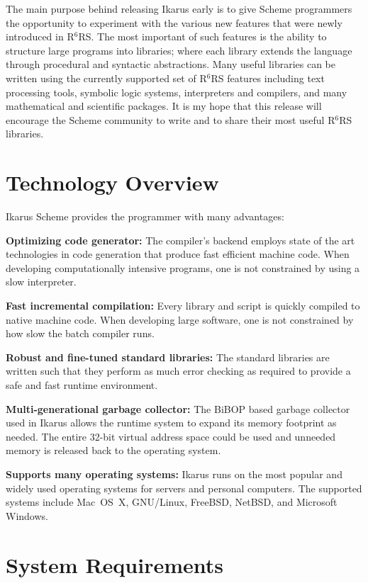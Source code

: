 \documentclass[onecolumn, 12pt, twoside, openright, dvipdfm]{book}
\newcommand{\rnrs}[1]{R$^{\mathrm{#1}}$RS}
\begin{document}
The main purpose behind releasing Ikarus early is to give Scheme
programmers the opportunity to experiment with the various new
features that were newly introduced in \rnrs{6}.  The most important
of such features is the ability to structure large programs into
libraries; where each library extends the language through
procedural and syntactic abstractions.  Many useful libraries can be
written using the currently supported set of \rnrs{6} features
including text processing tools, symbolic logic systems,
interpreters and compilers, and many mathematical and scientific
packages.  It is my hope that this release will encourage the
Scheme community to write and to share their most useful \rnrs{6}
libraries.


\newpage

\section{Technology Overview}

Ikarus Scheme provides the programmer with many advantages:

\textbf{Optimizing code generator:}  The compiler's backend employs
state of the art technologies in code generation that produce fast
efficient machine code.  When developing computationally intensive
programs, one is not constrained by using a slow interpreter.

\textbf{Fast incremental compilation:}  Every library and script is
quickly compiled to native machine code.  When developing large
software, one is not constrained by how slow the batch compiler
runs.

\textbf{Robust and fine-tuned standard libraries:}  The standard
libraries are written such that they perform as much error checking
as required to provide a safe and fast runtime environment. 

\textbf{Multi-generational garbage collector:} The
BiBOP\cite{dybvig:sm} based garbage collector used in Ikarus allows
the runtime system to expand its memory footprint as needed.  The
entire 32-bit virtual address space could be used and unneeded
memory is released back to the operating system.

\textbf{Supports many operating systems:} Ikarus runs on the most
popular and widely used operating systems for servers and personal
computers.  The supported systems include Mac~OS~X,
GNU/Linux, FreeBSD, NetBSD, and Microsoft Windows.


\section{System Requirements}
\end{document}
